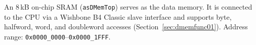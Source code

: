 An 8\,kB on-chip SRAM (\texttt{asDMemTop}) serves as the data memory.
It is connected to the CPU via a Wishbone B4 Classic slave interface and
supports byte, halfword, word, and doubleword accesses (Section~\ref{sec:dmemfunc01}).
Address range: \texttt{0x0000\_0000}--\texttt{0x0000\_1FFF}.
